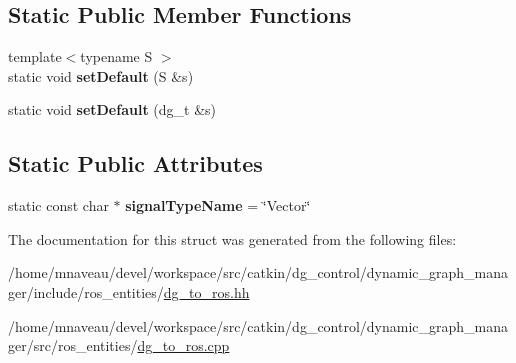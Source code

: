 \subsection*{Static Public Member Functions}
\begin{DoxyCompactItemize}
\item 
{\footnotesize template$<$typename S $>$ }\\static void {\bfseries set\+Default} (S \&s)\hypertarget{structdynamic__graph_1_1DgToRos_3_01Vector_01_4_a4013c3ef593096b73247ea076a67bcd0}{}\label{structdynamic__graph_1_1DgToRos_3_01Vector_01_4_a4013c3ef593096b73247ea076a67bcd0}

\item 
static void {\bfseries set\+Default} (dg\+\_\+t \&s)\hypertarget{structdynamic__graph_1_1DgToRos_3_01Vector_01_4_a6036a3447dfb27b19bca8495651c2a01}{}\label{structdynamic__graph_1_1DgToRos_3_01Vector_01_4_a6036a3447dfb27b19bca8495651c2a01}

\end{DoxyCompactItemize}
\subsection*{Static Public Attributes}
\begin{DoxyCompactItemize}
\item 
static const char $\ast$ {\bfseries signal\+Type\+Name} = \char`\"{}Vector\char`\"{}\hypertarget{structdynamic__graph_1_1DgToRos_3_01Vector_01_4_a860bb1281b52ba284b82845c3a1d0f2f}{}\label{structdynamic__graph_1_1DgToRos_3_01Vector_01_4_a860bb1281b52ba284b82845c3a1d0f2f}

\end{DoxyCompactItemize}


The documentation for this struct was generated from the following files\+:\begin{DoxyCompactItemize}
\item 
/home/mnaveau/devel/workspace/src/catkin/dg\+\_\+control/dynamic\+\_\+graph\+\_\+manager/include/ros\+\_\+entities/\hyperlink{dg__to__ros_8hh}{dg\+\_\+to\+\_\+ros.\+hh}\item 
/home/mnaveau/devel/workspace/src/catkin/dg\+\_\+control/dynamic\+\_\+graph\+\_\+manager/src/ros\+\_\+entities/\hyperlink{dg__to__ros_8cpp}{dg\+\_\+to\+\_\+ros.\+cpp}\end{DoxyCompactItemize}
